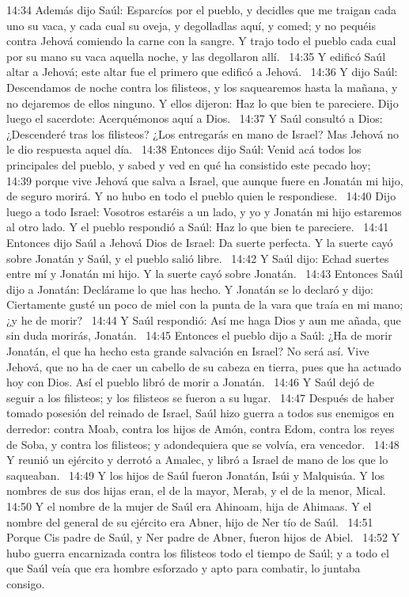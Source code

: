 14:34 Además dijo Saúl: Esparcíos por el pueblo, y decidles que me traigan cada uno su vaca, y cada cual su oveja, y degolladlas aquí, y comed; y no pequéis contra Jehová comiendo la carne con la sangre. Y trajo todo el pueblo cada cual por su mano su vaca aquella noche, y las degollaron allí.  
14:35 Y edificó Saúl altar a Jehová; este altar fue el primero que edificó a Jehová.  
14:36 Y dijo Saúl: Descendamos de noche contra los filisteos, y los saquearemos hasta la mañana, y no dejaremos de ellos ninguno. Y ellos dijeron: Haz lo que bien te pareciere. Dijo luego el sacerdote: Acerquémonos aquí a Dios.  
14:37 Y Saúl consultó a Dios: ¿Descenderé tras los filisteos? ¿Los entregarás en mano de Israel? Mas Jehová no le dio respuesta aquel día.  
14:38 Entonces dijo Saúl: Venid acá todos los principales del pueblo, y sabed y ved en qué ha consistido este pecado hoy;  
14:39 porque vive Jehová que salva a Israel, que aunque fuere en Jonatán mi hijo, de seguro morirá. Y no hubo en todo el pueblo quien le respondiese.  
14:40 Dijo luego a todo Israel: Vosotros estaréis a un lado, y yo y Jonatán mi hijo estaremos al otro lado. Y el pueblo respondió a Saúl: Haz lo que bien te pareciere.  
14:41 Entonces dijo Saúl a Jehová Dios de Israel: Da suerte perfecta. Y la suerte cayó sobre Jonatán y Saúl, y el pueblo salió libre.  
14:42 Y Saúl dijo: Echad suertes entre mí y Jonatán mi hijo. Y la suerte cayó sobre Jonatán.  
14:43 Entonces Saúl dijo a Jonatán: Declárame lo que has hecho. Y Jonatán se lo declaró y dijo: Ciertamente gusté un poco de miel con la punta de la vara que traía en mi mano; ¿y he de morir?  
14:44 Y Saúl respondió: Así me haga Dios y aun me añada, que sin duda morirás, Jonatán.  
14:45 Entonces el pueblo dijo a Saúl: ¿Ha de morir Jonatán, el que ha hecho esta grande salvación en Israel? No será así. Vive Jehová, que no ha de caer un cabello de su cabeza en tierra, pues que ha actuado hoy con Dios. Así el pueblo libró de morir a Jonatán.  
14:46 Y Saúl dejó de seguir a los filisteos; y los filisteos se fueron a su lugar.  
14:47 Después de haber tomado posesión del reinado de Israel, Saúl hizo guerra a todos sus enemigos en derredor: contra Moab, contra los hijos de Amón, contra Edom, contra los reyes de Soba, y contra los filisteos; y adondequiera que se volvía, era vencedor.  
14:48 Y reunió un ejército y derrotó a Amalec, y libró a Israel de mano de los que lo saqueaban.  
14:49 Y los hijos de Saúl fueron Jonatán, Isúi y Malquisúa. Y los nombres de sus dos hijas eran, el de la mayor, Merab, y el de la menor, Mical.  
14:50 Y el nombre de la mujer de Saúl era Ahinoam, hija de Ahimaas. Y el nombre del general de su ejército era Abner, hijo de Ner tío de Saúl.  
14:51 Porque Cis padre de Saúl, y Ner padre de Abner, fueron hijos de Abiel.  
14:52 Y hubo guerra encarnizada contra los filisteos todo el tiempo de Saúl; y a todo el que Saúl veía que era hombre esforzado y apto para combatir, lo juntaba consigo.  
